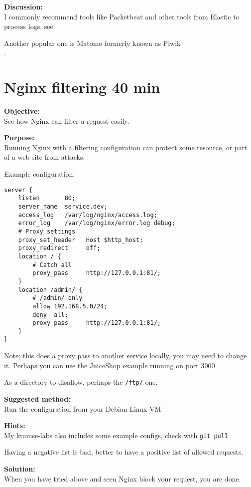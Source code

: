\documentclass[a4paper,11pt,notitlepage]{report}
\begin{document}
{\bf Discussion:}\\
I commonly recommend tools like Packetbeat and other tools from Elastic to process logs, see 

Another popular one is Matomo formerly known as Piwik\\
.


\chapter{Nginx filtering 40 min}
\label{ex:nginx-filtering}

{\bf Objective:}\\
See how Nginx can filter a request easily.


{\bf Purpose:}\\
Running Nginx with a filtering configuration can protect some resource, or part of a web site from attacks.

Example configuration:
\begin{verbatim}
server {
    listen       80;
    server_name  service.dev;
    access_log   /var/log/nginx/access.log;
    error_log    /var/log/nginx/error.log debug;
    # Proxy settings
    proxy_set_header   Host $http_host;
    proxy_redirect     off;
    location / {
        # Catch all
        proxy_pass     http://127.0.0.1:81/;
    }
    location /admin/ {
        # /admin/ only
        allow 192.168.5.0/24;
        deny  all;
        proxy_pass     http://127.0.0.1:81/;
    }
}
\end{verbatim}

Note; this does a proxy pass to another service locally, you may need to change it. Perhaps you can use the JuiceShop example running on port 3000.

As a directory to disallow, perhaps the \verb+/ftp/+ one.

{\bf Suggested method:}\\
Run the configuration from your Debian Linux VM


{\bf Hints:}\\
My kramse-labs also includes some example configs, check with \verb+git pull+

Having a negative list is bad, better to have a positive list of allowed requests.

{\bf Solution:}\\
When you have tried above and seen Nginx block your request, you are done.
\end{document}
